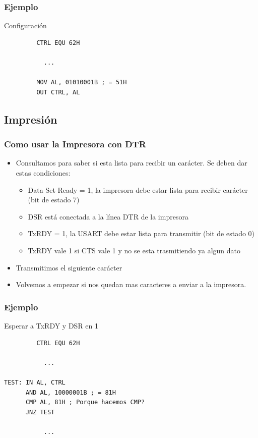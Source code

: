 \documentclass{beamer}
\begin{document}
\begin{frame}[fragile]
\frametitle{Ejemplo}
\begin{block}{Configuración}
 \begin{verbatim}
         CTRL EQU 62H
         
           ...
           
         MOV AL, 01010001B ; = 51H
         OUT CTRL, AL
 \end{verbatim}
\end{block}

\end{frame}

\subsection{Impresión}

\begin{frame}[fragile]
\frametitle{Como usar la Impresora con DTR}
\begin{itemize}
 \item  Consultamos para saber si esta lista para recibir un carácter. Se deben dar estas condiciones:
 \begin{itemize}
  \item Data Set Ready = 1, la impresora debe estar lista para recibir carácter (bit de estado 7)
  \item DSR está conectada a la línea DTR de la impresora
  \item TxRDY = 1, la USART debe estar lista para transmitir (bit de estado 0) 
  \item TxRDY vale 1 si CTS vale 1 y no se esta trasmitiendo ya algun dato
 \end{itemize}
\item Transmitimos el siguiente carácter 
\item Volvemos a empezar si nos quedan mas caracteres a enviar a la impresora.
\end{itemize}

\end{frame}


\begin{frame}[fragile]
\frametitle{Ejemplo}
\begin{block}{Esperar a TxRDY y DSR en 1}
 \begin{verbatim}
         CTRL EQU 62H
         
           ...
           
TEST: IN AL, CTRL
      AND AL, 10000001B ; = 81H
      CMP AL, 81H ; Porque hacemos CMP?
      JNZ TEST
      
           ...
 \end{verbatim}
\end{block}

\end{frame}
\end{document}
